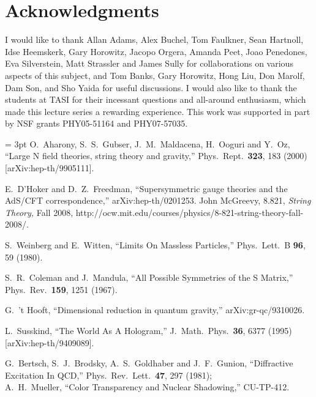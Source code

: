 \documentclass[12pt]{article}
\begin{document}
{%

\section*{Acknowledgments}
I would like to thank Allan Adams, Alex Buchel, Tom Faulkner, Sean Hartnoll, Idse Heemskerk, Gary Horowitz, Jacopo Orgera, Amanda Peet, Joao Penedones, Eva Silverstein, Matt Strassler and James Sully for collaborations on various aspects of this subject, and Tom Banks, Gary Horowitz, Hong Liu, Don Marolf, Dam Son, and Sho Yaida for useful discussions.  I would also like to thank the students at TASI for their incessant questions and all-around enthusiasm, which made this lecture series a rewarding experience.  This work was supported in part by NSF grants PHY05-51164 and PHY07-57035.
\begin{thebibliography}{99}
\itemsep = 3pt
  O.~Aharony, S.~S.~Gubser, J.~M.~Maldacena, H.~Ooguri and Y.~Oz,
  ``Large N field theories, string theory and gravity,''
  Phys.\ Rept.\  {\bf 323}, 183 (2000)
  [arXiv:hep-th/9905111].

  E.~D'Hoker and D.~Z.~Freedman,
  ``Supersymmetric gauge theories and the AdS/CFT correspondence,''
  arXiv:hep-th/0201253.
John McGreevy, 8.821, {\it String Theory,} Fall 2008, \hfill \hphantom{} http://ocw.mit.edu/courses/physics/8-821-string-theory-fall-2008/.

  S.~Weinberg and E.~Witten,
  ``Limits On Massless Particles,''
  Phys.\ Lett.\  B {\bf 96}, 59 (1980).

  S.~R.~Coleman and J.~Mandula,
  ``All Possible Symmetries of the S Matrix,''
  Phys.\ Rev.\  {\bf 159}, 1251 (1967).

  G.~'t Hooft,
  ``Dimensional reduction in quantum gravity,''
  arXiv:gr-qc/9310026.
  
  L.~Susskind,
  ``The World As A Hologram,''
  J.\ Math.\ Phys.\  {\bf 36}, 6377 (1995)
  [arXiv:hep-th/9409089].
  
  G.~Bertsch, S.~J.~Brodsky, A.~S.~Goldhaber and J.~F.~Gunion,
  ``Diffractive Excitation In QCD,''
  Phys.\ Rev.\ Lett.\  {\bf 47}, 297 (1981);\\
A.~H.~Mueller,
  ``Color Transparency and Nuclear Shadowing,''
  CU-TP-412.
  

\end{thebibliography}}
\end{document}
